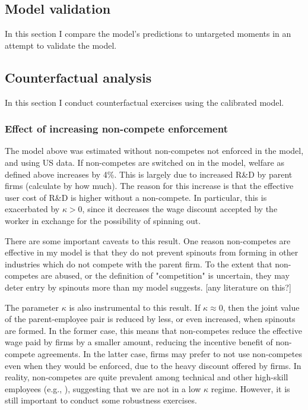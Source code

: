 \documentclass[11pt,english]{article}
\theoremstyle{remark}
\begin{document}
\subsection{Model validation}

In this section I compare the model's predictions to untargeted moments in an attempt to validate the model. 

\subsection{Counterfactual analysis}

In this section I conduct counterfactual exercises using the calibrated model. 

\subsubsection{Effect of increasing non-compete enforcement}

The model above was estimated without non-competes not enforced in the model, and using US data. If non-competes are switched on in the model, welfare as defined above increases by 4\%. This is largely due to increased R\&D by parent firms (calculate by how much). The reason for this increase is that the effective user cost of R\&D is higher without a non-compete. In particular, this is exacerbated by $\kappa > 0$, since it decreases the wage discount accepted by the worker in exchange for the possibility of spinning out. 

There are some important caveats to this result. One reason non-competes are effective in my model is that they do not prevent spinouts from forming in other industries which do not compete with the parent firm. To the extent that non-competes are abused, or the definition of "competition" is uncertain, they may deter entry by spinouts more than my model suggests. [any literature on this?]

The parameter $\kappa$ is also instrumental to this result. If $\kappa \approx 0$, then the joint value of the parent-employee pair is reduced by less, or even increased, when spinouts are formed. In the former case, this means that non-competes reduce the effective wage paid by firms by a smaller amount, reducing the incentive benefit of non-compete agreements. In the latter case, firms may prefer to not use non-competes even when they would be enforced, due to the heavy discount offered by firms. In reality, non-competes are quite prevalent among technical and other high-skill employees (e.g., \cite{starr_noncompetes_2019}), suggesting that we are not in a low $\kappa$ regime. However, it is still important to conduct some robustness exercises. 
\end{document}
